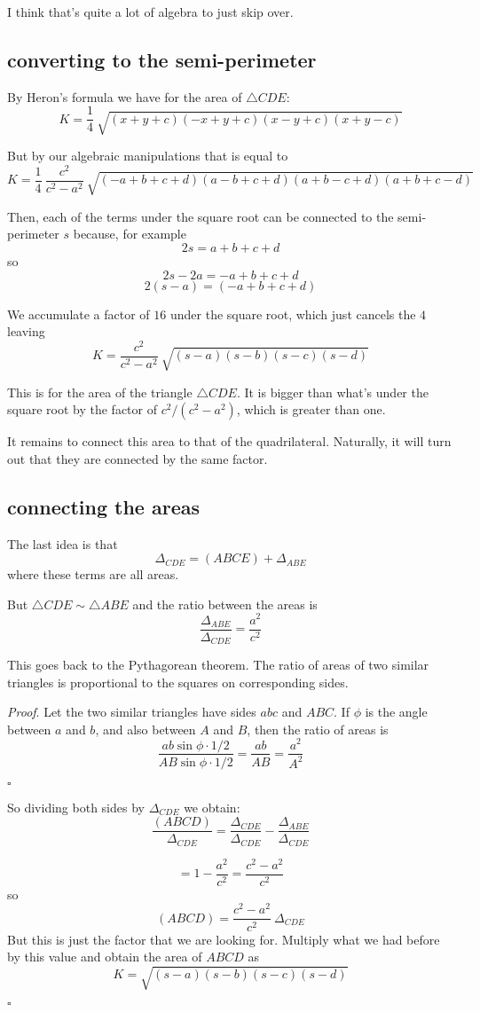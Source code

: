 \documentclass[11pt, oneside]{article}
\begin{document}
I think that's quite a lot of algebra to just skip over.

\subsection*{converting to the semi-perimeter}

By Heron's formula we have for the area of $\triangle CDE$:
\[ K = \frac{1}{4} \ \sqrt{(x + y + c)(-x + y + c)(x - y + c)(x + y - c)} \]

But by our algebraic manipulations that is equal to 
\[ K = \frac{1}{4} \ \frac{c^2}{c^2 - a^2}  \ \sqrt{(-a + b + c + d)(a - b + c + d)(a + b - c + d)(a + b +c - d) } \]

Then, each of the terms under the square root can be connected to the semi-perimeter $s$ because, for example
\[ 2s = a + b + c + d \]
so 
\[ 2s - 2a = - a + b + c + d\]
\[ 2(s - a) = (-a + b + c + d) \]

We accumulate a factor of $16$ under the square root, which just cancels the $4$ leaving
\[ K = \frac{c^2}{c^2 - a^2}  \ \sqrt{(s-a)(s-b)(s-c)(s-d) } \]

This is for the area of the triangle $\triangle CDE$.  It is bigger than what's under the square root by the factor of $c^2/(c^2 - a^2)$, which is greater than one.

It remains to connect this area to that of the quadrilateral.  Naturally, it will turn out that they are connected by the same factor.

\subsection*{connecting the areas}

The last idea is that
\[ \Delta_{CDE} = (ABCE)  + \Delta_{ABE} \]
where these terms are all areas.

But $\triangle CDE \sim \triangle ABE$ and the ratio between the areas is
\[ \frac{\Delta_{ABE}}{\Delta_{CDE}} = \frac{a^2}{c^2} \]

This goes back to the Pythagorean theorem.  The ratio of areas of two similar triangles is proportional to the squares on corresponding sides.

\emph{Proof}.
Let the two similar triangles have sides $abc$ and $ABC$.  If $\phi$ is the angle between $a$ and $b$, and also between $A$ and $B$, then the ratio of areas is
\[ \frac{ab \sin \phi \cdot 1/2}{AB \sin \phi \cdot 1/2} = \frac{ab}{AB} = \frac{a^2}{A^2} \]

$\square$

So dividing both sides by $\Delta_{CDE}$ we obtain:
\[ \frac{(ABCD)}{\Delta_{CDE}} = \frac{\Delta_{CDE}}{\Delta_{CDE}} - \frac{\Delta_{ABE}}{\Delta_{CDE}} \]

\[ = 1 - \frac{a^2}{c^2} = \frac{c^2 - a^2}{c^2} \]
so
\[ (ABCD) = \frac{c^2 - a^2}{c^2}  \ \Delta_{CDE} \]
But this is just the factor that we are looking for.  Multiply what we had before by this value and obtain the area of $ABCD$ as
\[ K =  \sqrt{(s-a)(s-b)(s-c)(s-d) } \]

$\square$
\end{document}
